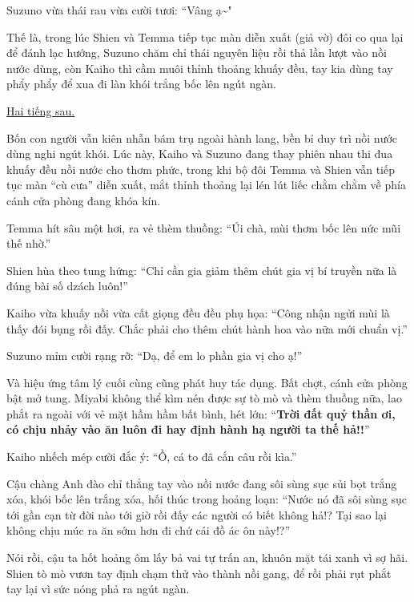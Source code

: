 \documentclass[../main.tex]{subfiles}
\begin{document}
Suzuno vừa thái rau vừa cười tươi: ``Vâng ạ\~{}"

Thế là, trong lúc Shien và Temma tiếp tục màn diễn xuất (giả vờ) đôi co qua lại để đánh lạc hướng, Suzuno chăm chỉ thái nguyên liệu rồi thả lần lượt vào nồi nước dùng, còn Kaiho thì cầm muôi thỉnh thoảng khuấy đều, tay kia dùng tay phẩy phẩy để xua đi làn khói trắng bốc lên ngút ngàn.

\begin{center}
    \uline{Hai tiếng sau.}
\end{center}

Bốn con người vẫn kiên nhẫn bám trụ ngoài hành lang, bền bỉ duy trì nồi nước dùng nghi ngút khói. Lúc này, Kaiho và Suzuno đang thay phiên nhau thi đua khuấy đều nồi nước cho thơm phức, trong khi bộ đôi Temma và Shien vẫn tiếp tục màn ``cù cưa'' diễn xuất, mắt thỉnh thoảng lại lén lút liếc chằm chằm về phía cánh cửa phòng đang khóa kín.

Temma hít sâu một hơi, ra vẻ thèm thuồng: ``Úi chà, mùi thơm bốc lên nức mũi thế nhờ.''

Shien hùa theo tung hứng: ``Chỉ cần gia giảm thêm chút gia vị bí truyền nữa là đúng bài số dzách luôn!''

Kaiho vừa khuấy nồi vừa cất giọng đều đều phụ họa: ``Công nhận ngửi mùi là thấy đói bụng rồi đấy. Chắc phải cho thêm chút hành hoa vào nữa mới chuẩn vị.''

Suzuno mỉm cười rạng rỡ: ``Dạ, để em lo phần gia vị cho ạ!''

Và hiệu ứng tâm lý cuối cùng cũng phát huy tác dụng. Bất chợt, cánh cửa phòng bật mở tung. Miyabi không thể kìm nén được sự tò mò và thèm thuồng nữa, lao phắt ra ngoài với vẻ mặt hầm hầm bất bình, hét lớn: ``\textbf{Trời đất quỷ thần ơi, có chịu nhảy vào ăn luôn đi hay định hành hạ người ta thế hả!!}''


Kaiho nhếch mép cười đắc ý: ``Ồ, cá to đã cắn câu rồi kìa.''

Cậu chàng Anh đào chỉ thẳng tay vào nồi nước đang sôi sùng sục sủi bọt trắng xóa, khói bốc lên trắng xóa, hối thúc trong hoảng loạn: ``Nước nó đã sôi sùng sục tới gần cạn từ đời nào tới giờ rồi đấy các người có biết không hả!? Tại sao lại không chịu múc ra ăn sớm hơn đi chứ cái đồ ác ôn này!?''

Nói rồi, cậu ta hốt hoảng ôm lấy bả vai tự trấn an, khuôn mặt tái xanh vì sợ hãi. Shien tò mò vươn tay định chạm thử vào thành nồi gang, để rồi phải rụt phắt tay lại vì sức nóng phả ra ngút ngàn.
\end{document}
